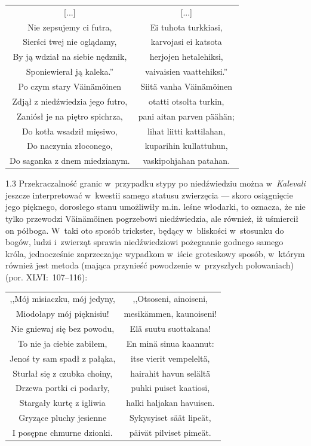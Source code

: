 \documentclass[11pt,a4paper,twoside]{report}
\begin{document}
{\centering
\small
\begin{longtable}{c c}
[...] & [...]\\
Nie zepsujemy ci futra, & Ei tuhota turkkiasi, \\
Sierści twej nie oglądamy, & karvojasi ei katsota \\
By ją wdział na siebie nędznik, & herjojen hetalehiksi, \\
Sponiewierał ją kaleka.'' & vaivaisien vaattehiksi.'' \\
Po czym stary Väinämöinen & Siitä vanha Väinämöinen \\
Zdjął z niedźwiedzia jego futro, & otatti otsolta turkin, \\
Zaniósł je na piętro spichrza, & pani aitan parven päähän; \\
Do kotła wsadził mięsiwo, & lihat liitti kattilahan, \\
Do naczynia złoconego, & kuparihin kullattuhun, \\
Do saganka z dnem miedzianym. & vaskipohjahan patahan. \\
\end{longtable}
}

\begin{spacing}{1.3}
Przekraczalność granic w~przypadku stypy po niedźwiedziu można w~\emph{Kalevali} jeszcze interpretować w~kwestii samego statusu zwierzęcia --- skoro osiągnięcie jego pięknego, dorosłego stanu umożliwiły m.in. leśne włodarki, to oznacza, że nie tylko przewodzi Väinämöinen pogrzebowi niedźwiedzia, ale również, iż uśmiercił on półboga. W~taki oto sposób trickster, będący w~bliskości w~stosunku do bogów, ludzi i~zwierząt sprawia niedźwiedziowi pożegnanie godnego samego króla, jednocześnie zaprzeczając wypadkom w~iście groteskowy sposób, w~którym również jest metoda (mająca przynieść powodzenie w~przyszłych polowaniach) (por. XLVI:~107--116):
\end{spacing}
{\centering
\small
\begin{longtable}{c c}
,,Mój misiaczku, mój jedyny, & ,,Otsoseni, ainoiseni,\\
Miodołapy mój pięknisiu! & mesikämmen, kaunoiseni!\\
Nie gniewaj się bez powodu, & Elä suutu suottakana!\\
To nie ja ciebie zabiłem, & En minä sinua kaannut:\\
Jenoś ty sam spadł z pałąka, & itse vierit vempeleltä,\\
Sturlał się z czubka choiny, & hairahit havun selältä\\
Drzewa portki ci podarły, & puhki puiset kaatiosi,\\
Stargały kurtę z igliwia & halki haljakan havuisen.\\
Gryzące pluchy jesienne & Sykysyiset säät lipeät,\\
I posępne chmurne dzionki. & päivät pilviset pimeät.\\
\end{longtable}
}
\end{document}
